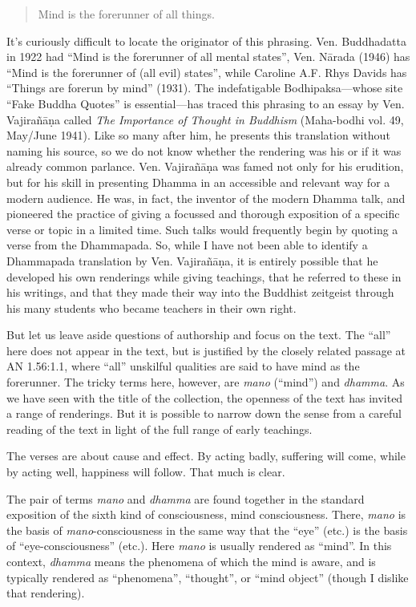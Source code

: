 \documentclass[12pt,openany]{book}%
\begin{document}
\begin{verse}%
Mind is the forerunner of all things.

%
\end{verse}

It’s curiously difficult to locate the originator of this phrasing. Ven. Buddhadatta in 1922 had “Mind is the forerunner of all mental states”, Ven. \textsanskrit{Nārada} (1946) has “Mind is the forerunner of (all evil) states”, while Caroline A.F. Rhys Davids has “Things are forerun by mind” (1931). The indefatigable Bodhipaksa—whose site “Fake Buddha Quotes” is essential—has traced this phrasing to an essay by Ven. \textsanskrit{Vajirañāṇa} called \textit{The Importance of Thought in Buddhism} (Maha-bodhi vol. 49, May/June 1941). Like so many after him, he presents this translation without naming his source, so we do not know whether the rendering was his or if it was already common parlance. Ven. \textsanskrit{Vajirañāṇa} was famed not only for his erudition, but for his skill in presenting Dhamma in an accessible and relevant way for a modern audience. He was, in fact, the inventor of the modern Dhamma talk, and pioneered the practice of giving a focussed and thorough exposition of a specific verse or topic in a limited time. Such talks would frequently begin by quoting a verse from the Dhammapada. So, while I have not been able to identify a Dhammapada translation by Ven. \textsanskrit{Vajirañāṇa}, it is entirely possible that he developed his own renderings while giving teachings, that he referred to these in his writings, and that they made their way into the Buddhist zeitgeist through his many students who became teachers in their own right.

But let us leave aside questions of authorship and focus on the text. The “all” here does not appear in the text, but is justified by the closely related passage at AN 1.56:1.1, where “all” unskilful qualities are said to have mind as the forerunner. The tricky terms here, however, are \textit{mano} (“mind”) and \textit{dhamma}. As we have seen with the title of the collection, the openness of the text has invited a range of renderings. But it is possible to narrow down the sense from a careful reading of the text in light of the full range of early teachings.

The verses are about cause and effect. By acting badly, suffering will come, while by acting well, happiness will follow. That much is clear.

The pair of terms \textit{mano} and \textit{dhamma} are found together in the standard exposition of the sixth kind of consciousness, mind consciousness. There, \textit{mano} is the basis of \textit{mano}-consciousness in the same way that the “eye” (etc.) is the basis of “eye-consciousness” (etc.). Here \textit{mano} is usually rendered as “mind”. In this context, \textit{dhamma} means the phenomena of which the mind is aware, and is typically rendered as “phenomena”, “thought”, or “mind object” (though I dislike that rendering).
\end{document}
